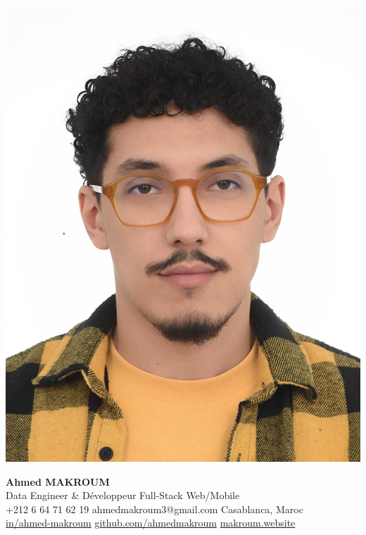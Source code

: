 \documentclass[10pt,a4paper,sans]{moderncv}
\begin{document}
  \hspace*{0.03\textwidth}%
  \begin{minipage}[c]{0.13\textwidth}
    \includegraphics[width=0.85\linewidth]{images/ahmed.jpg}
  \end{minipage}%
  \hfill
  \begin{minipage}[c]{0.84\textwidth}
    \begin{center}
      {\fontsize{20}{22}\selectfont\textbf{Ahmed MAKROUM}}\\[0.7em]
      {\fontsize{13.2}{15.4}\selectfont Data Engineer \& Développeur Full-Stack Web/Mobile} \\[0.5em] %
      {\fontsize{10.5}{12.3}\selectfont
        \faMobile\enspace +212 6 64 71 62 19 \quad
        \faEnvelope\enspace ahmedmakroum3@gmail.com \quad
        \faHome\enspace Casablanca, Maroc \\
        \faLinkedin\enspace \href{https://www.linkedin.com/in/ahmed-makroum/}{in/ahmed-makroum} \quad
        \faGithub\enspace \href{https://github.com/ahmedmakroum}{github.com/ahmedmakroum}
        \faGlobe\enspace \href{https://makroum.website}{makroum.website}
      }\\[1em]
    \end{center}
  \end{minipage}
  \vspace{-17pt}
\end{document}
